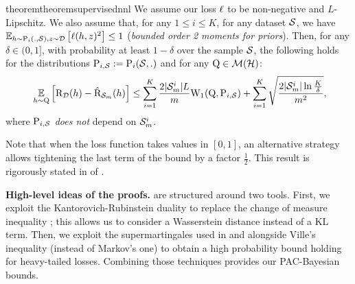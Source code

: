 \begin{restatable}{theorem}{theoremsupervisednnl}
\label{theorem:supervised-nnl}
We assume our loss $\loss$ to be non-negative and $L$-Lipschitz. We also assume that, for any $1\leq i\leq K$, for any dataset $\S$, we have $\EE_{h\sim \P_{i}(.,\S), z\sim \D}\LB \loss(h,z)^2 \RB \leq 1$ (\emph{bounded order 2 moments for priors}).
Then, for any $\delta\in(0,1]$, with probability at least $1-\delta$ over the sample $\S$, the following holds for the distributions $\P_{i,\S}\defeq \P_i(\S,.)$ and for any $\Q\in\Mcal(\H)$: 
\begin{align*}
\ \EE_{h\sim\Q}\Big[ \Risk_{\D}(h) - \Riskhat_{\Sm}(h) \Big] \le \sum_{i=1}^{K} \frac{2|\Sm^{i}|L}{m} \W_{1}(\Q, \P_{i,\S}) + \sum_{i=1}^{K} \sqrt{\frac{2|\Sm^{i}|\ln\frac{K}{\delta}}{m^2}}, 
\end{align*}
where $\P_{i,\S}$ {\it does not} depend on $\Sm^{i}$.
\end{restatable}

Note that when the loss function takes values in $[0,1]$, an alternative strategy allows tightening the last term of the bound by a factor $\frac{1}{2}$.
This result is rigorously stated in  of . 

\textbf{High-level ideas of the proofs.}
 are structured around two tools.
First, we exploit the Kantorovich-Rubinstein duality \cite[Remark 6.5]{villani2009optimal} to replace the change of measure inequality \cite{csizar1975divergence,donsker1976asymp}; this allows us to consider a Wasserstein distance instead of a KL term.
Then, we exploit the supermartingales used in  and \cite{chugg2023unified} alongside Ville's inequality (instead of Markov's one) to obtain a high probability bound holding for heavy-tailed losses.
Combining those techniques provides our PAC-Bayesian bounds.

